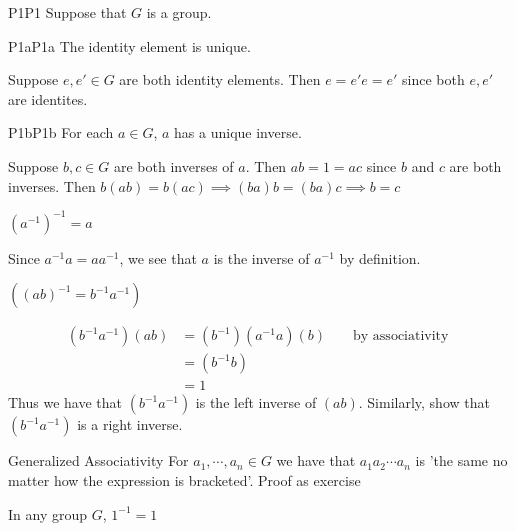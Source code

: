 \documentclass{article}
\begin{document}
\begin{cprop}{P1}{P1}
    Suppose that $G$ is a group.

    \begin{cprop}{P1a}{P1a}
        The identity element is unique.
        \begin{cpf}
            Suppose $e, e' \in G$ are both identity elements. Then $e = e'e = e'$ since both $e, e'$ are identites.
        \end{cpf}

    \end{cprop}

    \begin{cprop}{P1b}{P1b}
        For each $a \in G$, $a$ has a unique inverse.
        \begin{cpf}
            Suppose $b,c \in G$ are both inverses of $a$. Then $ab=1=ac$ since $b$ and $c$ are both inverses. Then $b(ab) = b(ac) \implies (ba)b = (ba)c \implies b=c$
        \end{cpf}
    \end{cprop}

    \begin{cprop}{}{}
       $\left( a^{-1} \right)^{-1} = a$
       \begin{cpf}
           Since $a^{-1}a = aa^{-1}$, we see that $a$ is the inverse of $a^{-1}$ by definition.
       \end{cpf}
    \end{cprop}

    \begin{cprop}{}{}
        $\left( (ab)^{-1} = b^{-1}a^{-1} \right)$
        \begin{cpf}
            \begin{align*}
                \left( b^{-1}a^{-1} \right) \left( ab \right) & = \left( b^{-1} \right)\left( a^{-1}a \right)\left( b \right) && \text{ by associativity }\\
                & = \left( b^{-1}b \right) \\
                & = 1
            \end{align*}
            Thus we have that $\left( b^{-1}a^{-1} \right)$ is the left inverse of $(ab)$. Similarly, show that $\left( b^{-1}a^{-1} \right)$ is a right inverse.
        \end{cpf}
    \end{cprop}

    \begin{cprop}{Generalized Associativity}{}
        For $a_1, \cdots, a_n \in G$ we have that $a_1a_2\cdots a_n$ is 'the same no matter how the expression is bracketed'. Proof as exercise
    \end{cprop}
    \begin{cprop}{}{}
        In any group $G$, $1^{-1} = 1$ 
    \end{cprop}
\end{cprop}
\end{document}
